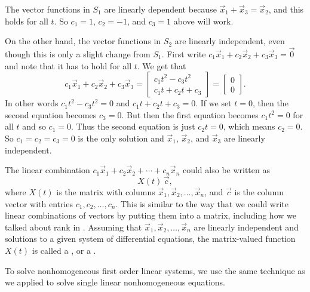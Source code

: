 \begin{exampleSol}
The vector functions in $S_1$ are linearly dependent because
$\vec{x}_1 + \vec{x}_3 = \vec{x}_2$, and this holds for all $t$.  So $c_1 =
1$, $c_2 = -1$, and $c_3 = 1$ above will work.

On the other hand, the vector functions in $S_2$ are linearly independent, even though this is only a slight change from $S_1$.
First write
$c_1 \vec{x}_1 + c_2 \vec{x}_2 + c_3 \vec{x}_3  = \vec{0}$ and note that it
has to hold for all $t$.  We get that
\begin{equation*}
c_1 \vec{x}_1 + c_2 \vec{x}_2 + c_3 \vec{x}_3
=
\begin{bmatrix}
c_1 t^2 - c_3 t^2
\\
c_1 t + c_2 t + c_3 
\end{bmatrix}
=
\begin{bmatrix}
0
\\
0
\end{bmatrix} .
\end{equation*}
In other words
$c_1 t^2 - c_3 t^2 = 0$ and
$c_1 t + c_2 t + c_3 = 0$.
If we set $t = 0$, then the second equation becomes $c_3 = 0$.  But then
the first equation becomes
$c_1 t^2 = 0$ for all $t$ and so $c_1 = 0$.  Thus the second equation
is just $c_2 t = 0$, which means $c_2 = 0$.  So $c_1 = c_2 = c_3 = 0$
is the only solution and $\vec{x}_1$,
$\vec{x}_2$, and $\vec{x}_3$ are linearly independent.
\end{exampleSol}

The linear combination $c_1 \vec{x}_1 + c_2 \vec{x}_2 + \cdots + c_n
\vec{x}_n$ could also be written as
\begin{equation*}
X(t)\,\vec{c} ,
\end{equation*}
where $X(t)$ is the matrix with columns $\vec{x}_1, \vec{x}_2, \ldots, \vec{x}_n$,
and $\vec{c}$ is the column vector with entries $c_1, c_2, \ldots, c_n$. This is similar to the way that we could write linear combinations of vectors by putting them into a matrix, including how we talked about rank in .
Assuming that $\vec{x}_1,\vec{x}_2,\ldots,\vec{x}_n$ are linearly
independent and solutions to a given system of differential equations,
the matrix-valued function $X(t)$ is called a \emph{},
or a \emph{}.

\medskip

To solve nonhomogeneous first order linear systems, we use the same
technique as we applied to solve single linear nonhomogeneous equations.

